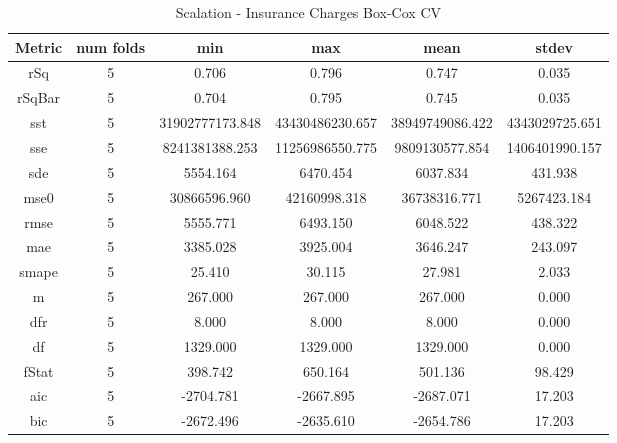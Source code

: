 \documentclass{article}
\begin{document}
\begin{table}[H]
\centering
\caption{Scalation - Insurance Charges Box-Cox CV}
\label{tab:Scalation - Insurance Charges Box-Cox CV}
\begin{tabular}{|c|c|c|c|c|c|}\hline
Metric & num folds & min & max & mean & stdev \\ \hline \hline
rSq & 5 & 0.706 & 0.796 & 0.747 & 0.035 \\ \hline
rSqBar & 5 & 0.704 & 0.795 & 0.745 & 0.035 \\ \hline
sst & 5 & 31902777173.848 & 43430486230.657 & 38949749086.422 & 4343029725.651 \\ \hline
sse & 5 & 8241381388.253 & 11256986550.775 & 9809130577.854 & 1406401990.157 \\ \hline
sde & 5 & 5554.164 & 6470.454 & 6037.834 & 431.938 \\ \hline
mse0 & 5 & 30866596.960 & 42160998.318 & 36738316.771 & 5267423.184 \\ \hline
rmse & 5 & 5555.771 & 6493.150 & 6048.522 & 438.322 \\ \hline
mae & 5 & 3385.028 & 3925.004 & 3646.247 & 243.097 \\ \hline
smape & 5 & 25.410 & 30.115 & 27.981 & 2.033 \\ \hline
m & 5 & 267.000 & 267.000 & 267.000 & 0.000 \\ \hline
dfr & 5 & 8.000 & 8.000 & 8.000 & 0.000 \\ \hline
df & 5 & 1329.000 & 1329.000 & 1329.000 & 0.000 \\ \hline
fStat & 5 & 398.742 & 650.164 & 501.136 & 98.429 \\ \hline
aic & 5 & -2704.781 & -2667.895 & -2687.071 & 17.203 \\ \hline
bic & 5 & -2672.496 & -2635.610 & -2654.786 & 17.203 \\ \hline
\end{tabular}
\end{table}
\end{document}
